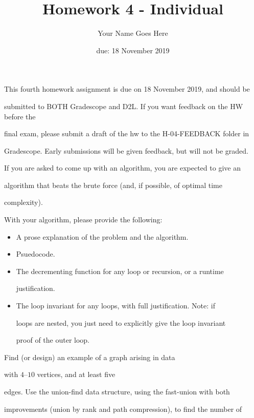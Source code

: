 \documentclass{article}
\author{Your Name Goes Here}
\date{due: 18 November 2019}
\title{Homework 4 - Individual}
\begin{document}
\maketitle



This fourth homework assignment is due on 18 November 2019, and should be

submitted to BOTH Gradescope and D2L.  If you want feedback on the HW before the

final exam, please submit a draft of the hw to the H-04-FEEDBACK folder in

Gradescope.  Early submissions will be given feedback, but will not be graded.



If you are asked to come up with an algorithm, you are expected to give an

algorithm that beats the brute force (and, if possible, of optimal time

complexity).

With your algorithm, please provide the following:

\begin{itemize}

    \item A prose explanation of the problem and the algorithm.

    \item Psuedocode.

    \item The decrementing function for any loop or recursion, or a runtime

        justification.

    \item The loop invariant for any loops, with full justification.  Note: if

        loops are nested, you just need to explicitly give the loop invariant

        proof of the outer loop.

\end{itemize}



\nextprob

Find (or design) an example of a graph arising in data

with $4$--$10$ vertices, and at least five

edges.  Use the union-find data structure, using the fast-union with both

improvements (union by rank and path compression), to find the number of
\end{document}
